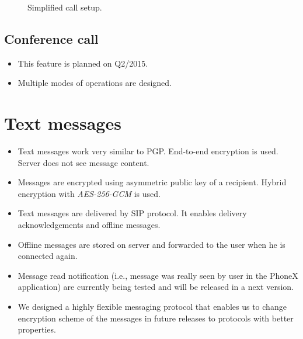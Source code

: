 \documentclass[a4paper,10pt]{article}
\begin{document}
\begin{center}
\begin{figure}[h!]
\centering
{}
\caption{Simplified call setup.}
\label{fig:call}
\end{figure}
\end{center}

\subsection{Conference call}
\begin{itemize}
 \item This feature is planned on Q2/2015. 
 \item Multiple modes of operations are designed.
\end{itemize}

\section{Text messages}
\begin{itemize}
 \item Text messages work very similar to PGP. End-to-end encryption is used. Server does not see message content.
 \item Messages are encrypted using asymmetric public key of a recipient. Hybrid encryption with \emph{AES-256-GCM} is used.
 \item Text messages are delivered by SIP protocol. It enables delivery acknowledgements and offline messages.
 \item Offline messages are stored on server and forwarded to the user when he is connected again.
 \item Message read notification (i.e., message was really seen by user in the PhoneX application) are currently being tested and will be released in a next version.
 \item We designed a highly flexible messaging protocol that enables us to change encryption scheme of the messages in future releases 
to protocols with better properties.
\end{itemize}
\end{document}
